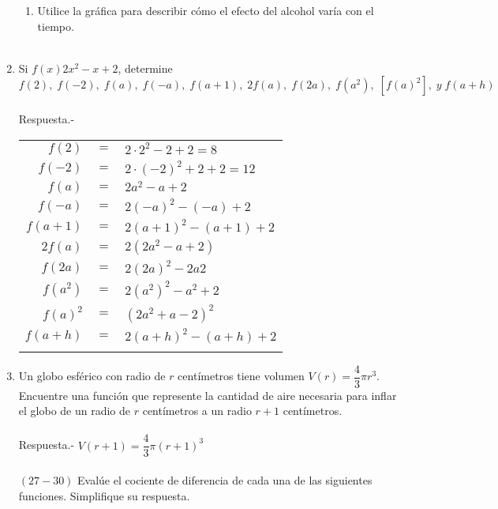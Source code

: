 \begin{enumerate}
\begin{enumerate}[\bfseries (a)]
	    \item Utilice la gráfica para describir cómo el efecto del alcohol varía con el tiempo.\\\\

	\end{enumerate}

    \item Si $f(x)2x^2 - x + 2$, determine $f(2),\; f(-2),\; f(a),\; f(-a),\; f(a+1),\; 2f(a),\; f(2a),\; f(a^2),\; [f(a)^2], \; y \; f(a+h)$\\\\
    Respuesta.-\; 
    \begin{center}
	\begin{tabular}{rcl}
	    $f(2)$ & $=$ & $2\cdot 2^2 - 2 + 2 = 8$\\
	     $f(-2)$ & $=$ & $2\cdot(-2)^2 + 2 +2 =12$\\
	     $f(a)$ & $=$ & $2a^2 - a + 2$\\
	     $f(-a)$ & $=$ & $2(-a)^2 - (-a) + 2$\\
	     $f(a+1)$ & $=$ & $2(a+1)^2 - (a+1) + 2$\\
	     $2f(a)$ & $=$ & $2(2a^2 - a + 2)$\\
	     $f(2a)$ & $=$ & $2(2a)^2 - 2a 2$\\
	     $f(a^2)$&$=$&$2(a^2)^2 - a^2 + 2$\\
	     $f(a)^2$&$=$&$(2a^2 + a - 2)^2$\\
	     $f(a+h)$&$=$&$2(a+h)^2 - (a+h) + 2$\\\\
	\end{tabular}
    \end{center}

\item Un globo esférico con radio de $r$ centímetros tiene volumen $V(r)=\dfrac{4}{3}\pi r^3$. Encuentre una función que represente la cantidad de aire necesaria para inflar el globo de un radio de $r$ centímetros a un radio $r+1$ centímetros.\\\\
    Respuesta.-\; $V(r+1)=\dfrac{4}{3}\pi (r+1)^3$\\\\

     $(27-30)$ Evalúe el cociente de diferencia de cada una de las siguientes funciones. Simplifique su respuesta.\\\\


\end{enumerate}
